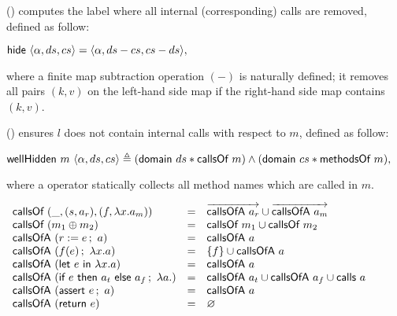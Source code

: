 () computes the label where all internal (corresponding) calls
are removed, defined as follow:

\begin{definition}
  \label{def-hide}
  \mbox{}
  \begin{center}
    \begin{math}
      \hide{\semlbl{\alpha}{ds}{cs}} = \semlbl{\alpha}{ds - cs}{cs - ds},
    \end{math}
  \end{center}
\end{definition}
where a finite map subtraction operation $(-)$ is naturally defined; it
removes all pairs $(k, v)$ on the left-hand side map if the right-hand
side map contains $(k, v)$.

() ensures $l$ does not contain internal calls with
respect to $m$, defined as follow:

\begin{definition}
  \label{def-wellhidden}
  \mbox{}
  \begin{center}
    \begin{math}
      \wellhidden{m}{\semlbl{\alpha}{ds}{cs}} \triangleq (\keysdisj{ds}{\callsofm{m}}) \wedge (\keysdisj{cs}{\methsofm{m}}),
    \end{math}
  \end{center}
\end{definition}
where a  operator statically collects all method names
which are called in $m$.

\begin{definition}
  \label{def-callsof}
  \mbox{}
  \begin{center}
    \begin{math}
      \begin{array}{lcl}
        \callsofm{(\_, \rulepair{s}{a_r}, \methodpair{f}{\lambda x.a_m})}
        & = & \listof{\callsofa{a_r}} \cup \listof{\callsofa{a_m}} \\
        \callsofm{(\modcomp{m_1}{m_2})} & = & \callsofm{m_1} \cup \callsofm{m_2} \\
        \callsofa{(\actwrite{r}{e}{a})} & = & \callsofa{a} \\
        \callsofa{(\actcall{x}{f}{e}{a})} & = & \{ f \} \cup \callsofa{a} \\
        \callsofa{(\actlet{e}{x}{a})} & = & \callsofa{a} \\
        \callsofa{(\actifelse{e}{a_t}{a_f}{a})} & = & \callsofa{a_t} \cup \callsofa{a_f} \cup \callsof{a} \\
        \callsofa{(\actassert{e}{a})} & = & \callsofa{a} \\
        \callsofa{(\actret{e})} & = & \emptyset \\
      \end{array}
    \end{math}
  \end{center}
\end{definition}

